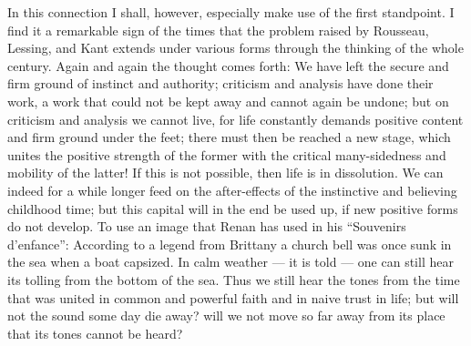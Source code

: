 \documentclass[12pt,a4paper,openany]{book}
\begin{document}
In this connection I shall, however, especially make use of the
first standpoint. I find it a remarkable sign of the times
that the problem raised by Rousseau, Lessing, and Kant extends
under various forms through the thinking of the whole century.
Again and again the thought comes forth: We have
left the secure and firm ground of instinct and authority;
criticism and analysis have done their work, a work that could
not be kept away and cannot again be undone;
but on criticism and analysis we cannot live, for life constantly
demands positive content and firm ground under the feet; there
must then be reached a new stage, which unites the positive
strength of the former with the critical many-sidedness and
mobility of the latter! If this is not possible, then life is in dissolution.
We can indeed for a while longer feed on
the after-effects of the instinctive and believing childhood time;
but this capital will in the end be used up, if
new positive forms do not develop. To use an image
that Renan has used in his ``Souvenirs d'enfance'': According to
a legend from Brittany a church bell was once sunk in the sea
when a boat capsized. In calm weather ---
it is told --- one can still hear its tolling from
the bottom of the sea. Thus we still hear the tones from the time
that was united in common and powerful faith and in naive trust in
life; but will not the sound some day die away? will we not
move so far away from its place that its tones cannot
be heard?
\end{document}
